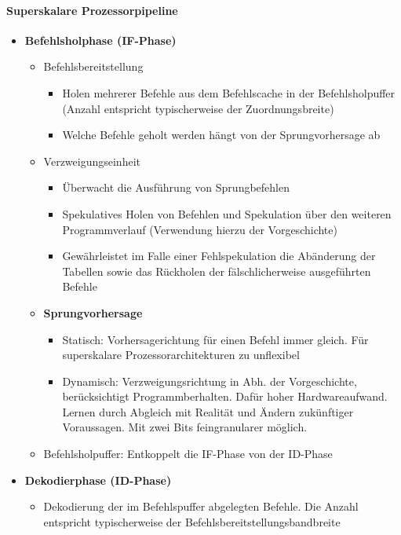 \paragraph{Superskalare Prozessorpipeline}
\begin{itemize}
	\item \textbf{Befehlsholphase (IF-Phase)}
	\begin{itemize}
		\item Befehlsbereitstellung
		\begin{itemize}
			\item Holen mehrerer Befehle aus dem Befehlscache in der Befehlsholpuffer (Anzahl entspricht typischerweise der Zuordnungsbreite)
			\item Welche Befehle geholt werden hängt von der Sprungvorhersage ab
		\end{itemize}
		\item Verzweigungseinheit
		\begin{itemize}
			\item Überwacht die Ausführung von Sprungbefehlen
			\item Spekulatives Holen von Befehlen und Spekulation über den weiteren Programmverlauf (Verwendung hierzu der Vorgeschichte)
			\item Gewährleistet im Falle einer Fehlspekulation die Abänderung der Tabellen sowie das Rückholen der fälschlicherweise ausgeführten Befehle
		\end{itemize}
		\item \textbf{Sprungvorhersage} 
		\begin{itemize}
			\item Statisch: Vorhersagerichtung für einen Befehl immer gleich. Für superskalare Prozessorarchitekturen zu unflexibel
			\item Dynamisch: Verzweigungsrichtung in Abh. der Vorgeschichte, berücksichtigt Programmberhalten. Dafür hoher Hardwareaufwand. Lernen durch Abgleich mit Realität und Ändern zukünftiger Voraussagen. Mit zwei Bits feingranularer möglich.
		\end{itemize}
		\item Befehlsholpuffer: Entkoppelt die IF-Phase von der ID-Phase
	\end{itemize}
	\item \textbf{Dekodierphase (ID-Phase)}
	\begin{itemize}
		\item Dekodierung der im Befehlspuffer abgelegten Befehle. Die Anzahl entspricht typischerweise der Befehlsbereitstellungsbandbreite

\end{itemize}
\end{itemize}
